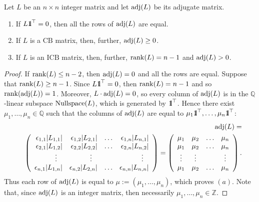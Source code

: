 \documentclass[ALCO]{cedram}
\newcommand{\mbz}{\mbox{$\mathbb{Z}$}}
\newcommand{\mbq}{\mbox{$\mathbb{Q}$}}
\newcommand{\mbone}{\mbox{$1\mkern-4.6mu {\rm l}$}}
\newcommand{\icb}{\mbox{$\mathrm{ICB}$}}
\newcommand{\cb}{\mbox{$\mathrm{CB}$}}
\newcommand{\rank}{\mbox{${\rm rank}$}}
\newcommand{\nulls}{\mbox{${\rm Nullspace}$}}
\newcommand{\adj}{\mbox{${\rm adj}$}}
\begin{document}
\begin{proposition}\label{adj(L)rowconstant}
Let $L$ be an $n\times n$ integer matrix and let $\adj(L)$ be its
adjugate matrix.\leavevmode
\begin{enumerate}[label=\textup{(}\alph*\textup{)}]
\item If $L\mbone^{\top}=0$, then all the rows of $\adj(L)$ are
  equal.
\item If $L$ is a $\cb$ matrix, then, further, $\adj(L)\geq 0$.
\item If $L$ is an $\icb$ matrix, then, further, $\rank(L)=n-1$
  and $\adj(L)>0$.
\end{enumerate}
\end{proposition}
\begin{proof}
If $\rank(L)\leq n-2$, then $\adj(L)=0$ and all the rows are
equal. Suppose that $\rank(L)\geq n-1$. Since $L\mbone^{\top}=0$, then
$\rank(L)=n-1$ and so $\rank(\adj(L))=1$. Moreover, $L\cdot\adj(L)=0$,
so every column of $\adj(L)$ is in the $\mbq$-linear subspace
$\nulls(L)$, which is generated by $\mbone^{\top}$. Hence there exist
$\mu_1,\ldots ,\mu_n\in\mbq$ such that the columns of $\adj(L)$ are
equal to $\mu_1\mbone^{\top}, \ldots,\mu_n\mbone^{\top}$:
\begin{eqnarray}\label{adjugate}
&&\adj(L)= \\ && \left(\begin{array}{rrrr} \epsilon_{1,1}\lvert
L_{1,1}\rvert&\epsilon_{1,2}\lvert L_{2,1}\rvert&\ldots&
\epsilon_{1,n}\lvert L_{n,1}\rvert\\ \epsilon_{2,1}\lvert
L_{1,2}\rvert&\epsilon_{2,2}\lvert L_{2,2}\rvert&\ldots&
\epsilon_{2,n}\lvert L_{n,2}\rvert\\ 
\vdots\phantom{+}&\vdots\phantom{+}&&\vdots\phantom{+}
\\ \epsilon_{n,1}\lvert L_{1,n}\rvert&\epsilon_{n,2}\lvert 
L_{2,n}\rvert&\ldots& \epsilon_{n,n}\lvert L_{n,n}\rvert
\end{array}\right)= 
\left(\begin{array}{cccc}
\mu_1&\mu_2&\ldots&\mu_n\\
\mu_1&\mu_2&\ldots&\mu_n\\
\vdots&\vdots&&\vdots\\
\mu_1&\mu_2&\ldots&\mu_n
\end{array}\right). \notag
\end{eqnarray}
Thus each row of $\adj(L)$ is equal to $\mu:=(\mu_1,\ldots ,\mu_n)$,
which proves $(a)$. Note that, since $\adj(L)$ is an integer matrix,
then necessarily $\mu_1,\ldots ,\mu_n\in\mbz$.


\end{proof}
\end{document}
